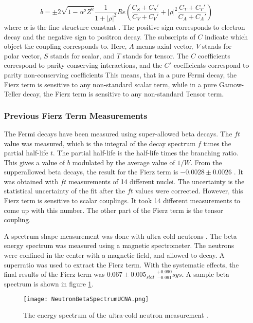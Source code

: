 \documentclass[../MaxHughesThesis.tex]{subfiles}
\begin{document}
\begin{equation}
	b =  \pm 2 \sqrt{1 - \alpha^{2}{Z^{2}}}\frac{1}{1 + |\rho|^{2}}Re(\frac{C_{S} + C_{S}'}{C_{V} + C_{V}'} + |\rho|^{2}\frac{C_{T} + C_{T}'}{C_{A} + C_{A}'})
	\label{eq:bwrittenout}
\end{equation}
where $\alpha$ is the fine structure constant \cite{Jack57}.
The positive sign corresponds to electron decay and the negative sign to positron decay.  
The subscripts of $C$ indicate which object the coupling corresponds to. 
Here, $A$ means axial vector, $V$ stands for polar vector, $S$ stands for scalar, and $T$ stands for tensor. 
The $C$ coefficients correspond to parity conserving interactions, and the $C'$ coefficients correspond to parity non-conserving coefficients \cite{Lee56}
This means, that in a pure Fermi decay, the Fierz term is sensitive to any non-standard scalar term, while in a pure Gamow-Teller decay, the Fierz term is sensitive to any non-standard Tensor term. 

\subsubsection{Previous Fierz Term Measurements}
The Fermi decays have been measured using super-allowed beta decays.
The $ft$ value was measured, which is the integral of the decay spectrum $f$ times the partial half-life $t$.
The partial half-life is the half-life times the branching ratio.
This gives a value of $b$ modulated by the average value of $1/W$.
From the supperallowed beta decays, the result for the Fierz term is $-0.0028 \pm 0.0026$ \cite{Har17}.
It was obtained with $ft$ measurements of 14 different nuclei.
The uncertainty is the statistical uncertainty of the fit after the $ft$ values were corrected.
However, this Fierz term is sensitive to scalar couplings.
It took 14 different measurements to come up with this number.
The other part of the Fierz term is the tensor coupling. 

A spectrum shape measurement was done with ultra-cold neutrons \cite{Hic17}.
The beta energy spectrum was measured using a magnetic spectrometer.
The neutrons were confined in the center with a magnetic field, and allowed to decay.
A superratio was used to extract the Fierz term.
With the systematic effects, the final results of the Fierz term was $0.067 \pm 0.005_{stat}$ $ ^{+0.090}_{-0.061} sys$.
A sample beta spectrum is shown in figure \ref{fig:ucnabeta}.

\begin{figure}[!htb]
        \centerline{\texttt{[image: NeutronBetaSpectrumUCNA.png]}}
        \caption{The energy spectrum of the ultra-cold neutron measurement \cite{Hic17}. }
        \label{fig:ucnabeta}
\end{figure}
\end{document}
